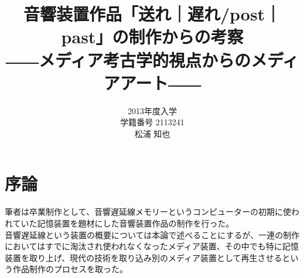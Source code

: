 \documentclass[a4paper,report]{jsbook}
\title{\Large 音響装置作品「送れ｜遅れ/post｜past」の制作からの考察\\――メディア考古学的視点からのメディアアート――}
\author{2013年度入学\\学籍番号 2113241\\松浦 知也}
\begin{document}
\maketitle

\tableofcontents

\makeatletter
\long{}
\makeatother

\makeatletter
\let\@oldmakecaption=\@makecaption
\let\oldthefigure=\thefigure
\let\oldtheHfigure=\theHfigure
\makeatother

\makeatletter
{}
\newenvironment{no-prefix-figure-caption}{
  \let\@makecaption=\@makenoprefixcaption
  \renewcommand\thefigure{x.\thefigno}
  \renewcommand\theHfigure{x.\thefigno}
  \stepcounter{figno}
}{
  \let\thefigure=\oldthefigure
  \let\theHfigure=\oldtheHfigure
  \let\@makecaption=\@oldmakecaption
  \addtocounter{figure}{-1}
}
\makeatother

\renewcommand{\figurename}{図}

\newcommand{\plusnamesingular}{}
\newcommand{\starnamesingular}{}
\newcommand{\xrefname}[1]{\protect\renewcommand{\plusnamesingular}{#1}}
\newcommand{\Xrefname}[1]{\protect\renewcommand{\starnamesingular}{#1}}
\providecommand{\cref}{\plusnamesingular~\ref}
\providecommand{\Cref}{\starnamesingular~\ref}
\providecommand{\crefformat}[2]{}
\providecommand{\Crefformat}[2]{}

\crefformat{figure}{図~#2#1#3}
\Crefformat{figure}{図~#2#1#3}

\chapter{序論}\label{ux5e8fux8ad6}

筆者は卒業制作として、音響遅延線メモリーというコンピューターの初期に使われていた記憶装置を題材にした音響装置作品の制作を行った。\\
音響遅延線という装置の概要については本論で述べることにするが、一連の制作においてはすでに淘汰され使われなくなったメディア装置、その中でも特に記憶装置を取り上げ、現代の技術を取り込み別のメディア装置として再生させるという作品制作のプロセスを取った。
\end{document}
